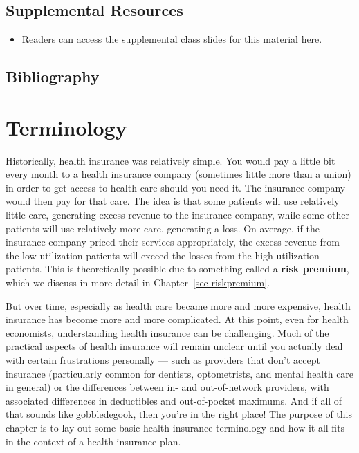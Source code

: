 \documentclass[
  letterpaper,
  DIV=11,
  numbers=noendperiod]{scrreport}
\providecommand{\tightlist}{%
  \setlength{\itemsep}{0pt}\setlength{\parskip}{0pt}}\usepackage{longtable,booktabs,array}
\theoremstyle{definition}
\theoremstyle{remark}
\begin{document}
\hypertarget{supplemental-resources-1}{%
\section*{Supplemental Resources}\label{supplemental-resources-1}}


\begin{itemize}
\tightlist
\item
  Readers can access the supplemental class slides for this material
  \href{supp/index-slides.html}{here}.
\end{itemize}

\hypertarget{bibliography-1}{%
\section*{Bibliography}\label{bibliography-1}}


\hypertarget{terminology}{%
\chapter{Terminology}\label{terminology}}

Historically, health insurance was relatively simple. You would pay a
little bit every month to a health insurance company (sometimes little
more than a union) in order to get access to health care should you need
it. The insurance company would then pay for that care. The idea is that
some patients will use relatively little care, generating excess revenue
to the insurance company, while some other patients will use relatively
more care, generating a loss. On average, if the insurance company
priced their services appropriately, the excess revenue from the
low-utilization patients will exceed the losses from the
high-utilization patients. This is theoretically possible due to
something called a \textbf{risk premium}, which we discuss in more
detail in Chapter~\ref{sec-riskpremium}.

But over time, especially as health care became more and more expensive,
health insurance has become more and more complicated. At this point,
even for health economists, understanding health insurance can be
challenging. Much of the practical aspects of health insurance will
remain unclear until you actually deal with certain frustrations
personally --- such as providers that don't accept insurance
(particularly common for dentists, optometrists, and mental health care
in general) or the differences between in- and out-of-network providers,
with associated differences in deductibles and out-of-pocket maximums.
And if all of that sounds like gobbledegook, then you're in the right
place! The purpose of this chapter is to lay out some basic health
insurance terminology and how it all fits in the context of a health
insurance plan.
\end{document}
